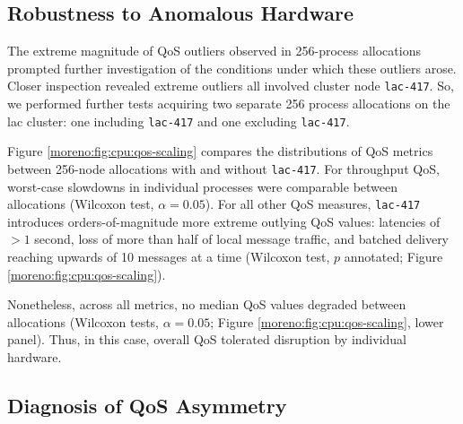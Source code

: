 
\subsection{Robustness to Anomalous Hardware}
\label{moreno:sec:with-lac-417-vs-sans-lac-417}

% 
The extreme magnitude of QoS outliers observed in 256-process allocations prompted further investigation of the conditions under which these outliers arose.
Closer inspection revealed extreme outliers all involved cluster node \texttt{lac-417}.
So, we performed further tests acquiring two separate 256 process allocations on the lac cluster: one including \texttt{lac-417} and one excluding \texttt{lac-417}.

Figure \ref{moreno:fig:cpu:qos-scaling} compares the distributions of QoS metrics between 256-node allocations with and without \texttt{lac-417}.
For throughput QoS, worst-case slowdowns in individual processes were comparable between allocations (Wilcoxon test, $\alpha = 0.05$).
For all other QoS measures, \texttt{lac-417} introduces orders-of-magnitude more extreme outlying QoS values: latencies of $>1$ second, loss of more than half of local message traffic, and batched delivery reaching upwards of 10 messages at a time (Wilcoxon test, $p$ annotated; Figure \ref{moreno:fig:cpu:qos-scaling}).

Nonetheless, across all metrics, no median QoS values degraded between allocations (Wilcoxon tests, $\alpha = 0.05$; Figure \ref{moreno:fig:cpu:qos-scaling}, lower panel).
Thus, in this case, overall QoS tolerated disruption by individual hardware.

\subsection{Diagnosis of QoS Asymmetry}
\label{moreno:sec:case1:asymmetry}


